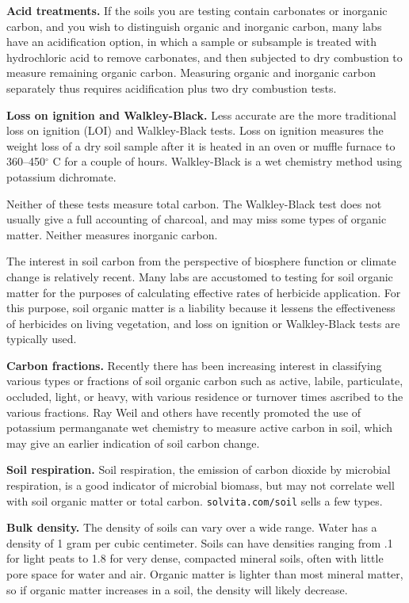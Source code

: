 \documentclass[11pt,letterpaper,oneside,onecolumn]{memoir}
\begin{document}
\textbf{Acid treatments.} If the soils you are testing contain carbonates or inorganic carbon, and you wish to distinguish organic and inorganic carbon, many labs have an acidification option, in which a sample or subsample is treated with hydrochloric acid to remove carbonates, and then subjected to dry combustion to measure remaining organic carbon. Measuring organic and inorganic carbon separately thus requires acidification plus two dry combustion tests.

\textbf{Loss on ignition and Walkley-Black.} Less accurate are the more traditional loss on ignition (LOI) and Walkley-Black tests. Loss on ignition measures the weight loss of a dry soil sample after it is heated in an oven or muffle furnace to 360--450$^{\circ}$ C for a couple of hours. Walkley-Black is a wet chemistry method using potassium dichromate.

Neither of these tests measure total carbon. The Walkley-Black test does not usually give a full accounting of charcoal, and may miss some types of organic matter. Neither measures inorganic carbon.

The interest in soil carbon from the perspective of biosphere function or climate change is relatively recent. Many labs are accustomed to testing for soil organic matter for the purposes of calculating effective rates of herbicide application. For this purpose, soil organic matter is a liability because it lessens the effectiveness of herbicides on living vegetation, and loss on ignition or Walkley-Black tests are typically used.

\textbf{Carbon fractions.} Recently there has been increasing interest in classifying various types or fractions of soil organic carbon such as active, labile, particulate, occluded, light, or heavy, with various residence or turnover times ascribed to the various fractions. Ray Weil and others have recently promoted the use of potassium permanganate wet chemistry to measure active carbon in soil, which may give an earlier indication of soil carbon change.

\textbf{Soil respiration.} Soil respiration, the emission of carbon dioxide by microbial respiration, is a good indicator of microbial biomass, but may not correlate well with soil organic matter or total carbon. \texttt{solvita.com/soil} sells a few types.

\textbf{Bulk density.} The density of soils can vary over a wide range. Water has a density of 1 gram per cubic centimeter. Soils can have densities ranging from .1 for light peats to 1.8 for very dense, compacted mineral soils, often with little pore space for water and air. Organic matter is lighter than most mineral matter, so if organic matter increases in a soil, the density will likely decrease.
\end{document}

